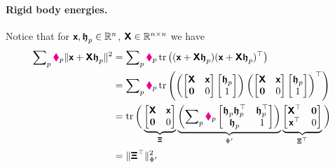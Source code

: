 \paragraph*{Rigid body energies.}
Notice that for $\boldsymbol{\mathsf{x}}, \boldsymbol{\mathfrak{h}}_{p} \in \mathbb{R}^{n}$, $\boldsymbol{\mathsf{X}} \in \mathbb{R}^{n\times n}$ we have
\begin{align}\label{eq:RBProtoEnergy}
 \sumParticles \particleMass{\PidxI} \norm{\protox + \protoX \particleBodyPos{\PidxI}}^2
 &= \sumParticles \particleMass{\PidxI} \tr\big( (\protox + \protoX \particleBodyPos{\PidxI})(\protox + \protoX \particleBodyPos{\PidxI})^\top \big)
\nonumber\\
 &= \sumParticles \particleMass{\PidxI} \tr\left( \left(\begin{bmatrix} \protoX & \protox \\ \mat{0} & 0 \end{bmatrix}\begin{bmatrix} \particleBodyPos{\PidxI}\\ 1 \end{bmatrix} \right) \left(\begin{bmatrix} \protoX & \protox \\ \mat{0} & 0 \end{bmatrix}\begin{bmatrix} \particleBodyPos{\PidxI}\\ 1 \end{bmatrix} \right)^\top \right)
\nonumber\\
 &= \tr\bigg( \underbrace{\begin{bmatrix} \protoX & \protox \\ \mat{0} & 0 \end{bmatrix}}_{\protoXi} \underbrace{\left( \sumParticles \particleMass{\PidxI} \begin{bmatrix} \particleBodyPos{\PidxI} \particleBodyPos{\PidxI}^\top & \particleBodyPos{\PidxI}^\top \\ \particleBodyPos{\PidxI} & 1 \end{bmatrix} \right)}_{\bodyInertiaMatp{}{}} \underbrace{\begin{bmatrix} \protoX^\top & \mat{0} \\ \protox^\top & 0 \end{bmatrix}}_{\protoXi^\top} \bigg)
\nonumber\\
 &= \norm[\bodyInertiaMatp{}{}]{\protoXi^\top}^2
\end{align}
